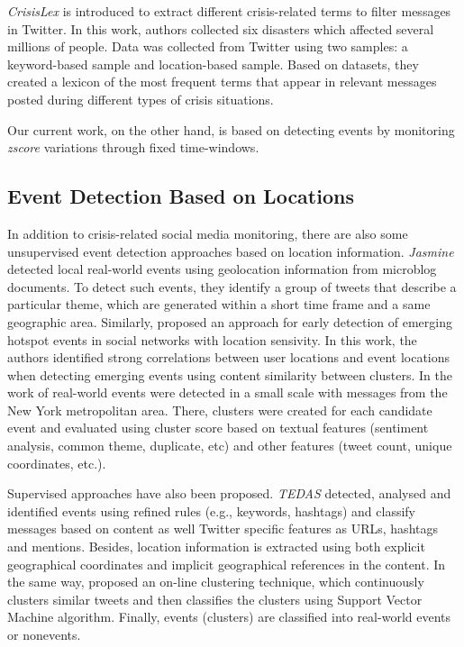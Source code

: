 \documentclass[sigconf]{acmart}
\begin{document}
\textit{CrisisLex} \cite{olteanu2014} is introduced to extract different crisis-related terms to filter messages in Twitter. In this work,
authors collected six disasters which affected several millions of people. Data was collected from Twitter using two samples: a keyword-based sample and location-based sample. Based on datasets, they created a lexicon of the most frequent terms that appear in relevant messages posted during different types of crisis situations.

Our current work, on the other hand, is based on detecting events by monitoring \textit{zscore} variations through fixed time-windows.

\subsection{Event Detection Based on Locations}

In addition to crisis-related social media monitoring, there are also some unsupervised event detection approaches based on location information. \textit{Jasmine} \cite{watanabe2011jasmine} detected local real-world events using geolocation information from microblog documents. To detect such events, they identify a group of tweets that describe a particular theme, which are generated within a short time frame and a same geographic area. Similarly, \citeauthor*{unankard2015emerging} \cite{unankard2015emerging} proposed an approach for early detection of emerging hotspot events in social networks with location sensivity. In this work, the authors identified strong correlations between user locations and event locations when detecting emerging events using content similarity between clusters. In the work of \citeauthor{walther2013geo} \cite{walther2013geo} real-world events were detected in a small scale with messages from the New York metropolitan area. There, clusters were created for each candidate event and evaluated using cluster score based on textual features (sentiment analysis, common theme, duplicate, etc) and other features (tweet count, unique coordinates, etc.).

Supervised approaches have also been proposed. \textit{TEDAS} \cite{li2012tedas} detected, analysed and identified events using refined rules (e.g., keywords, hashtags) and classify messages based on content as well Twitter specific features as URLs, hashtags and mentions. Besides, location information is extracted using both explicit geographical coordinates and implicit geographical references in the content. In the same way, \citeauthor{becker2011beyond} \cite{becker2011beyond} proposed an on-line clustering technique, which continuously clusters similar tweets and then classifies the clusters using Support Vector Machine algorithm. Finally, events (clusters) are classified into real-world events or nonevents.
\end{document}
